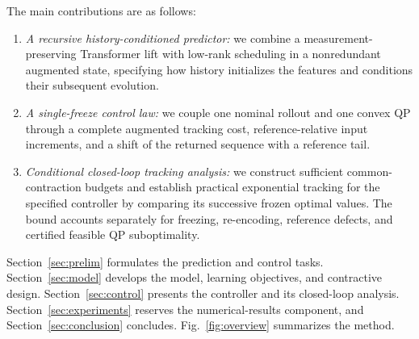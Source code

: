 \documentclass[journal]{IEEEtran}
\begin{document}
The main contributions are as follows:
\begin{enumerate}
\item \emph{A recursive history-conditioned predictor:} we combine a measurement-preserving Transformer lift with low-rank scheduling in a nonredundant augmented state, specifying how history initializes the features and conditions their subsequent evolution.
\item \emph{A single-freeze control law:} we couple one nominal rollout and one convex QP through a complete augmented tracking cost, reference-relative input increments, and a shift of the returned sequence with a reference tail.
\item \emph{Conditional closed-loop tracking analysis:} we construct sufficient common-contraction budgets and establish practical exponential tracking for the specified controller by comparing its successive frozen optimal values. The bound accounts separately for freezing, re-encoding, reference defects, and certified feasible QP suboptimality.
\end{enumerate}

Section~\ref{sec:prelim} formulates the prediction and control tasks. Section~\ref{sec:model} develops the model, learning objectives, and contractive design. Section~\ref{sec:control} presents the controller and its closed-loop analysis. Section~\ref{sec:experiments} reserves the numerical-results component, and Section~\ref{sec:conclusion} concludes. Fig.~\ref{fig:overview} summarizes the method.
\end{document}
